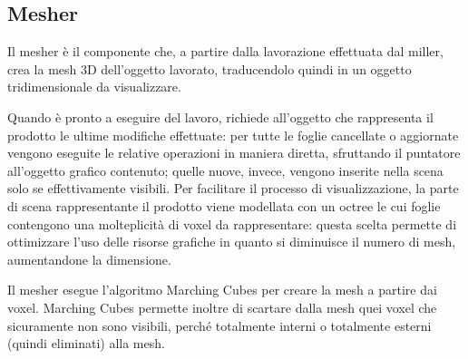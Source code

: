 \subsection{Mesher}
\label{sec:modules_mesher}

Il mesher è il componente che, a partire dalla lavorazione effettuata dal miller, crea la mesh 3D dell'oggetto lavorato, traducendolo quindi in un oggetto tridimensionale da visualizzare.

Quando è pronto a eseguire del lavoro, richiede all’oggetto che rappresenta il prodotto le ultime modifiche effettuate: per tutte le foglie cancellate o aggiornate vengono eseguite le relative operazioni in maniera diretta, sfruttando il puntatore all’oggetto grafico contenuto;  quelle nuove, invece, vengono inserite nella scena solo se effettivamente visibili. Per facilitare il processo di visualizzazione, la parte di scena rappresentante il prodotto viene modellata con un octree le cui foglie contengono una molteplicità di voxel da rappresentare: questa scelta permette di ottimizzare l’uso delle risorse grafiche in quanto si diminuisce il numero di mesh, aumentandone la dimensione.

Il mesher esegue l'algoritmo Marching Cubes per creare la mesh a partire dai voxel. Marching Cubes permette inoltre di scartare dalla mesh quei voxel che sicuramente non sono visibili, perché totalmente interni o totalmente esterni (quindi eliminati) alla mesh.



